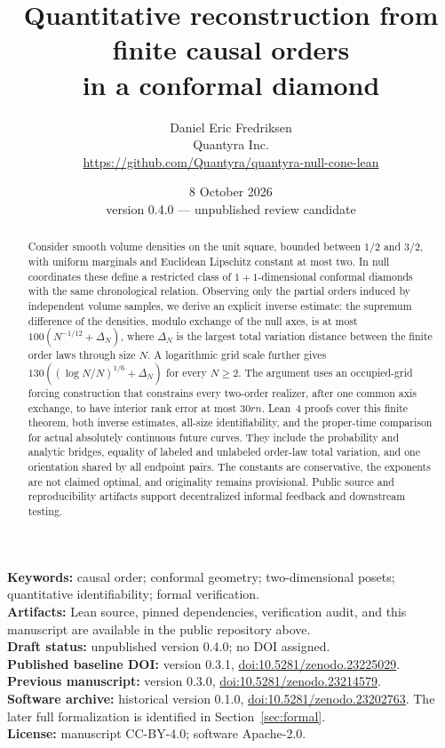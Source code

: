 \documentclass[11pt]{article}
\title{Quantitative reconstruction from finite causal orders\\in a conformal diamond}
\author{Daniel Eric Fredriksen\\Quantyra Inc.\\\url{https://github.com/Quantyra/quantyra-null-cone-lean}}
\date{8 October 2026 \\ version 0.4.0 --- unpublished review candidate}
\theoremstyle{remark}
\begin{document}
\maketitle
\begin{abstract}
Consider smooth volume densities on the unit square, bounded between
$1/2$ and $3/2$, with uniform marginals and Euclidean Lipschitz constant at
most two. In null coordinates these define a restricted class of
$1+1$-dimensional conformal diamonds with the same chronological relation.
Observing only the partial orders induced by independent volume samples,
we derive an explicit inverse estimate: the supremum difference of the
densities, modulo exchange of the null axes, is at most
$100(N^{-1/12}+\Delta_N)$, where $\Delta_N$ is the largest total variation
distance between the finite order laws through size $N$. A logarithmic
grid scale further gives $130((\log N/N)^{1/6}+\Delta_N)$ for every
$N\ge2$. The argument
uses an occupied-grid forcing construction that constrains every
two-order realizer, after one common axis exchange, to have interior
rank error at most $30rn$. Lean~4 proofs cover this finite theorem,
both inverse estimates, all-size identifiability, and the proper-time
comparison for actual absolutely continuous future curves. They include
the probability and analytic bridges, equality of labeled and unlabeled
order-law total variation, and one orientation shared by all endpoint pairs.
The constants are conservative, the exponents are not claimed optimal,
and originality remains provisional. Public source and reproducibility
artifacts support decentralized informal feedback and downstream testing.
\end{abstract}

\noindent\textbf{Keywords:} causal order; conformal geometry; two-dimensional
posets; quantitative identifiability; formal verification.\\
\textbf{Artifacts:} Lean source, pinned dependencies, verification audit,
and this manuscript are available in the public repository above.\\
\textbf{Draft status:} unpublished version 0.4.0; no DOI assigned.\\
\textbf{Published baseline DOI:} version 0.3.1,
\href{https://doi.org/10.5281/zenodo.23225029}{doi:10.5281/zenodo.23225029}.\\
\textbf{Previous manuscript:} version 0.3.0,
\href{https://doi.org/10.5281/zenodo.23214579}{doi:10.5281/zenodo.23214579}.\\
\textbf{Software archive:} historical version 0.1.0,
\href{https://doi.org/10.5281/zenodo.23202763}{doi:10.5281/zenodo.23202763}.
The later full formalization is identified in Section~\ref{sec:formal}.\\
\textbf{License:} manuscript CC-BY-4.0; software Apache-2.0.
\end{document}
